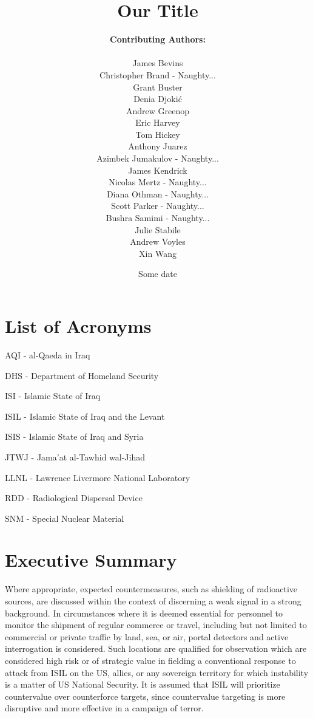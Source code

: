 \documentclass{report}
\title{Our Title}
\date{Some date}
\author{\textbf{Contributing Authors:}\\ \\
James	Bevins\\
Christopher	Brand - Naughty...\\
Grant	Buster\\
Denia	Djoki\'{c}\\
Andrew	Greenop\\
Eric	Harvey\\
Tom	Hickey\\
Anthony	Juarez\\
Azimbek	Jumakulov - Naughty...\\
James	Kendrick\\
Nicolas	Mertz - Naughty...\\
Diana	Othman - Naughty...\\
Scott	Parker - Naughty...\\
Bushra	Samimi - Naughty...\\
Julie	Stabile\\
Andrew	Voyles\\
Xin	Wang
}
\begin{document}
% 
% 
% 
% 
% 


\begin{titlepage}
\maketitle
\thispagestyle{empty}
\end{titlepage}

\tableofcontents
\thispagestyle{fancyTOC}


\listoffigures
\thispagestyle{fancyTOC}


\listoftables
\thispagestyle{fancyTOC}

\newpage



\chapter*{List of Acronyms}
\thispagestyle{fancyacronym}

AQI -  al-Qaeda in Iraq

DHS - Department of Homeland Security

ISI - Islamic State of Iraq

ISIL - Islamic State of Iraq and the Levant

ISIS - Islamic State of Iraq and Syria

JTWJ - Jama'at al-Tawhid wal-Jihad 

LLNL -  Lawrence Livermore National Laboratory

RDD - Radiological Dispersal Device

SNM - Special Nuclear Material




\chapter{Executive Summary}

Where appropriate, expected countermeasures, such as shielding of radioactive sources, are discussed within the context of discerning a weak signal in a strong background. In circumstances where it is deemed essential for personnel to monitor the shipment of regular commerce or travel, including but not limited to commercial or private traffic by land, sea, or air, portal detectors and active interrogation is considered. Such locations are qualified for observation which are considered high risk or of strategic value in fielding a conventional response to attack from ISIL on the US, allies, or any sovereign territory for which instability is a matter of US National Security. It is assumed that ISIL will prioritize countervalue over counterforce targets, since countervalue targeting is more disruptive and more effective in a campaign of terror.
\end{document}
